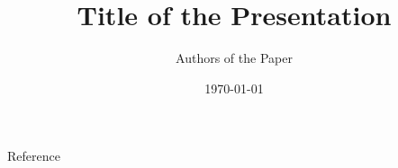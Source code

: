 \documentclass{beamer}
\title{Title of the Presentation}
\author{Authors of the Paper}
\institute{Institution}
\date{\today}
\begin{document}

\begin{frame}[allowframebreaks]{Reference}
    
\end{frame}
\end{document}
